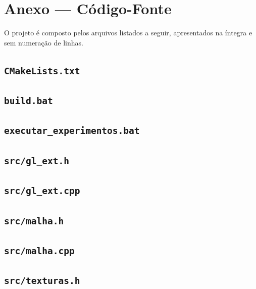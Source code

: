 \documentclass[12pt,a4paper]{article}
\begin{document}
\newpage
\section*{Anexo --- Código-Fonte}

O projeto é composto pelos arquivos listados a seguir, apresentados na íntegra e sem numeração
de linhas.

\subsection*{\texttt{CMakeLists.txt}}


\subsection*{\texttt{build.bat}}


\subsection*{\texttt{executar\_experimentos.bat}}


\subsection*{\texttt{src/gl\_ext.h}}


\subsection*{\texttt{src/gl\_ext.cpp}}


\subsection*{\texttt{src/malha.h}}


\subsection*{\texttt{src/malha.cpp}}


\subsection*{\texttt{src/texturas.h}}

\end{document}
